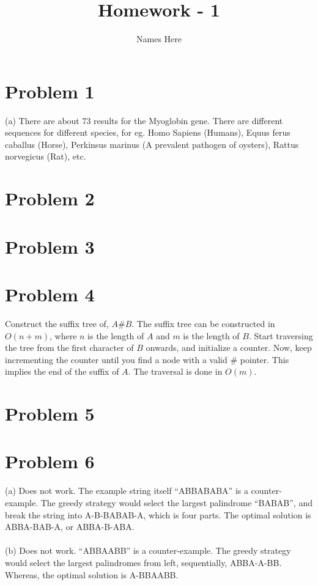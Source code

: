 \documentclass{article}
\title{Homework - 1}
\author{Names Here}
\begin{document}
\maketitle

\clearpage


\section{Problem 1}
(a) There are about 73 results for the Myoglobin gene. There are different sequences for different species, for eg. Homo Sapiens (Humans), Equus ferus caballus (Horse), Perkinsus marinus (A prevalent pathogen of oysters), Rattus norvegicus (Rat), etc.

\clearpage

\section{Problem 2}
\clearpage

\section{Problem 3}
\clearpage

\section{Problem 4}
Construct the suffix tree of, {$ A\#B $}. 
The suffix tree can be constructed in {$ O(n+m) $}, where {$ n $} is 
the length of {$ A $} and {$ m $} is the length of {$ B $}. 
Start traversing the tree from the first character of {$ B $} onwards, 
and initialize a counter. Now, keep incrementing the counter until you 
find a node with a valid \# pointer. This implies the end of the suffix 
of {$ A $}. The traversal is done in {$ O(m) $}. 
\clearpage

\section{Problem 5}
\clearpage

\section{Problem 6}
(a) Does not work. The example string itself “ABBABABA” is a 
counter-example. The greedy strategy would select the largest 
palindrome “BABAB”, and break the string into A-B-BABAB-A, 
which is four parts. The optimal solution is ABBA-BAB-A, or ABBA-B-ABA.\\
\\
(b) Does not work. “ABBAABB” is a counter-example. The greedy strategy 
would select the largest palindromes from left, sequentially, ABBA-A-BB. 
Whereas, the optimal solution is A-BBAABB.
\clearpage
\end{document}

